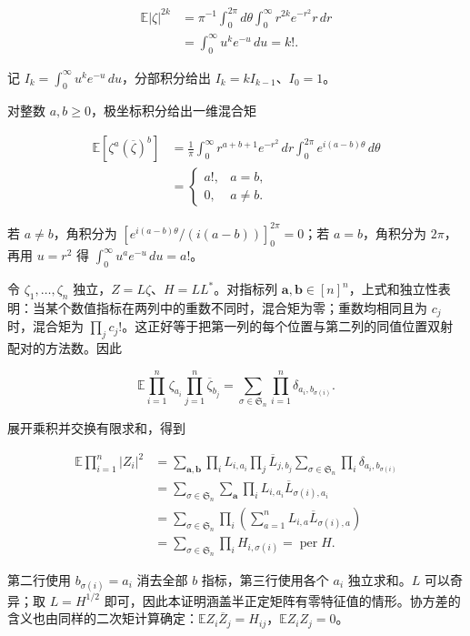 \documentclass[11pt,a4paper]{article}
\begin{document}
\[
\begin{aligned}
\mathbb E|\zeta|^{2k}
&=\pi^{-1}\int_0^{2\pi}\!d\theta\int_0^{\infty}r^{2k}e^{-r^2}r\,dr\\
&=\int_0^{\infty}u^ke^{-u}\,du=k!.
\end{aligned}
\]

记 \(I_k=\int_0^\infty u^ke^{-u}\,du\)，分部积分给出 \(I_k=kI_{k-1}\)、\(I_0=1\)。

对整数 \(a,b\ge0\)，极坐标积分给出一维混合矩

\[
\begin{aligned}
\mathbb E[\zeta^a(\overline\zeta)^b]
&=\frac1\pi\int_0^\infty r^{a+b+1}e^{-r^2}\,dr
\int_0^{2\pi}e^{i(a-b)\theta}\,d\theta\\
&=\begin{cases}a!,&a=b,\\0,&a\ne b.\end{cases}
\end{aligned}
\]

若 \(a\ne b\)，角积分为 \([e^{i(a-b)\theta}/(i(a-b))]_0^{2\pi}=0\)；若 \(a=b\)，角积分为 \(2\pi\)，再用 \(u=r^2\) 得 \(\int_0^\infty u^ae^{-u}\,du=a!\)。

令 \(\zeta_1,\ldots,\zeta_n\) 独立，\(Z=L\zeta\)、\(H=LL^*\)。对指标列 \(\boldsymbol a,\boldsymbol b\in[n]^n\)，上式和独立性表明：当某个数值指标在两列中的重数不同时，混合矩为零；重数均相同且为 \(c_j\) 时，混合矩为 \(\prod_jc_j!\)。这正好等于把第一列的每个位置与第二列的同值位置双射配对的方法数。因此

\[
\mathbb E\prod_{i=1}^n\zeta_{a_i}\prod_{j=1}^n\overline\zeta_{b_j}
=\sum_{\sigma\in \mathfrak S_n}\prod_{i=1}^n\delta_{a_i,b_{\sigma(i)}}.
\]

展开乘积并交换有限求和，得到

\[
\begin{aligned}
\mathbb E\prod_{i=1}^n|Z_i|^2
&=\sum_{\boldsymbol a,\boldsymbol b}
\prod_iL_{i,a_i}\prod_j\overline L_{j,b_j}
\sum_{\sigma\in \mathfrak S_n}\prod_i\delta_{a_i,b_{\sigma(i)}}\\
&=\sum_{\sigma\in \mathfrak S_n}\sum_{\boldsymbol a}
\prod_i L_{i,a_i}\overline L_{\sigma(i),a_i}\\
&=\sum_{\sigma\in \mathfrak S_n}\prod_i
\left(\sum_{a=1}^nL_{i,a}\overline L_{\sigma(i),a}\right)\\
&=\sum_{\sigma\in \mathfrak S_n}\prod_iH_{i,\sigma(i)}
=\operatorname{per}H.
\end{aligned}
\]

第二行使用 \(b_{\sigma(i)}=a_i\) 消去全部 \(b\) 指标，第三行使用各个 \(a_i\) 独立求和。\(L\) 可以奇异；取 \(L=H^{1/2}\) 即可，因此本证明涵盖半正定矩阵有零特征值的情形。协方差的含义也由同样的二次矩计算确定：\(\mathbb EZ_i\overline Z_j=H_{ij}\)，\(\mathbb EZ_iZ_j=0\)。
\end{document}
